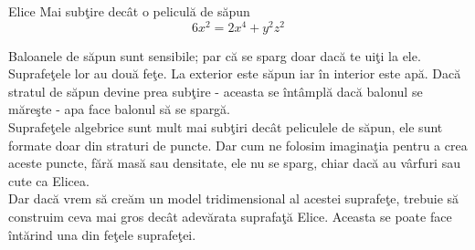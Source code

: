\begin{surferPage}{Elice}
Mai sub\c tire dec\^at o pelicul\u a de s\u apun\\
  \smallskip
\[6x^2	= 2x^4	+ y^2	z^2\]

\singlespacing
Baloanele de s\u apun sunt sensibile; par c\u a se sparg doar dac\u a te ui\c ti la ele.
Suprafe\c tele lor au dou\u a fe\c te. La exterior este s\u apun iar \^in interior este ap\u a.
Dac\u a stratul de s\u apun devine prea sub\c tire - aceasta se \^int\^ampl\u a dac\u a balonul se m\u are\c ste - apa 
face balonul s\u a se sparg\u a.\\
\vspace{0,3cm}
Suprafe\c tele algebrice sunt mult mai sub\c tiri dec\^at peliculele de s\u apun, ele sunt formate 
doar din straturi de puncte.
Dar cum ne folosim imagina\c tia pentru a crea aceste puncte, f\u ar\u a mas\u a sau densitate, ele nu se sparg, chiar
dac\u a au v\^arfuri sau cute ca Elicea.\\
\vspace{0,3cm}
Dar dac\u a vrem s\u a cre\u am un model tridimensional al acestei suprafe\c te, trebuie s\u a construim ceva mai gros dec\^at adev\u arata 
suprafa\c t\u a Elice. Aceasta se poate face \^int\u arind una din fe\c tele suprafe\c tei. 
\end{surferPage}
